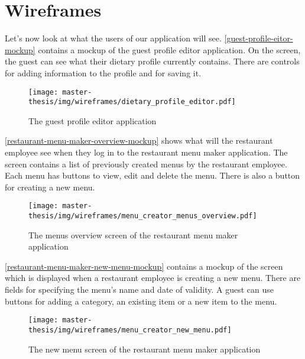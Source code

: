 \section{Wireframes}
Let's now look at what the users of our application will see.
\autoref{guest-profile-eitor-mockup} contains a mockup of the guest profile editor application.
On the screen, the guest can see what their dietary profile currently contains.
There are controls for adding information to the profile and for saving it.

\begin{figure}[h]
  \centering
  \texttt{[image: master-thesis/img/wireframes/dietary\_profile\_editor.pdf]}
  \caption{The guest profile editor application}\label{guest-profile-eitor-mockup}
\end{figure}

\autoref{restaurant-menu-maker-overview-mockup} shows what will the restaurant employee see when they log in to the restaurant menu maker application.
The screen contains a list of previously created menus by the restaurant employee.
Each menu has buttons to view, edit and delete the menu.
There is also a button for creating a new menu.

\begin{figure}[h]
  \centering
  \texttt{[image: master-thesis/img/wireframes/menu\_creator\_menus\_overview.pdf]}
  \caption{The menus overview screen of the restaurant menu maker application}\label{restaurant-menu-maker-overview-mockup}
\end{figure}

\autoref{restaurant-menu-maker-new-menu-mockup} contains a mockup of the screen which is displayed when a restaurant employee is creating a new menu.
There are fields for specifying the menu's name and date of validity.
A guest can use buttons for adding a category, an existing item or a new item to the menu.

\begin{figure}[h]
  \centering
  \texttt{[image: master-thesis/img/wireframes/menu\_creator\_new\_menu.pdf]}
  \caption{The new menu screen of the restaurant menu maker application}\label{restaurant-menu-maker-new-menu-mockup}
\end{figure}

